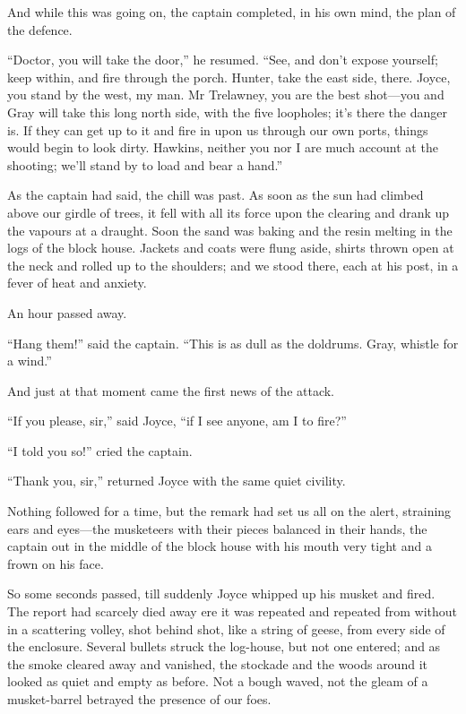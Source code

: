 And while this was going on, the captain completed, in his own mind, the plan of the defence.

\enquote{Doctor, you will take the door,} he resumed. \enquote{See, and don’t expose yourself; keep within, and fire through the porch. Hunter, take the east side, there. Joyce, you stand by the west, my man. Mr Trelawney, you are the best shot---you and Gray will take this long north side, with the five loopholes; it’s there the danger is. If they can get up to it and fire in upon us through our own ports, things would begin to look dirty. Hawkins, neither you nor I are much account at the shooting; we’ll stand by to load and bear a hand.}

As the captain had said, the chill was past. As soon as the sun had climbed above our girdle of trees, it fell with all its force upon the clearing and drank up the vapours at a draught. Soon the sand was baking and the resin melting in the logs of the block house. Jackets and coats were flung aside, shirts thrown open at the neck and rolled up to the shoulders; and we stood there, each at his post, in a fever of heat and anxiety.

An hour passed away.

\enquote{Hang them!} said the captain. \enquote{This is as dull as the doldrums. Gray, whistle for a wind.}

And just at that moment came the first news of the attack.

\enquote{If you please, sir,} said Joyce, \enquote{if I see anyone, am I to fire?}

\enquote{I told you so!} cried the captain.

\enquote{Thank you, sir,} returned Joyce with the same quiet civility.

Nothing followed for a time, but the remark had set us all on the alert, straining ears and eyes---the musketeers with their pieces balanced in their hands, the captain out in the middle of the block house with his mouth very tight and a frown on his face.

So some seconds passed, till suddenly Joyce whipped up his musket and fired. The report had scarcely died away ere it was repeated and repeated from without in a scattering volley, shot behind shot, like a string of geese, from every side of the enclosure. Several bullets struck the log-house, but not one entered; and as the smoke cleared away and vanished, the stockade and the woods around it looked as quiet and empty as before. Not a bough waved, not the gleam of a musket-barrel betrayed the presence of our foes.

